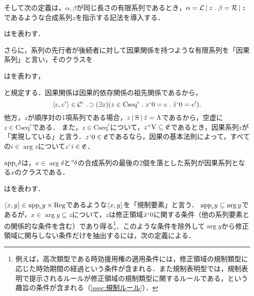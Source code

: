 \noindent そして次の定義は，$\alpha,\beta$が同じ長さの有限系列であるとき，$ \alpha = \mathcal{L}\resl z\con{1}\beta = \mathcal{R}\resl z $であるような合成系列$ z $を指示する記法を導入する．
\begin{df}
\label{df:合成系列}
    \kagi{$
        \alpha*\beta
    $}はを表わす．
\end{df}

\noindent さらに，系列の先行者が後続者に対して因果関係を持つような有限系列を「因果系列」と言い，そのクラスを
\begin{df}
\label{df:因果系列}
はを表わす，
\end{df}
\noindent と規定する．因果関係は因果的依存関係の祖先関係であるから，
\[
    \orp{e,e'}\in\mathcal{C}^\epsilon\case{1}{1}{0}
    (\exists z)(
        z\in \mathrm{Cseq}^\epsilon\con{1}z\fap 0 = e\con{1}\tilde{z}\fap 0 = e'
    ).
\]
他方，$z$が順序対の1項系列である場合，$ z\mathbin{\mid}\mathrm{S}\mathbin{\mid}\breve{z}=\Lambda $であるから，空虚に$ z\in\mathrm{Cseq}^\epsilon $である．
また，$z\in\mathrm{Cseq}^\epsilon$について，$z{\mspace{1mu}{``}\mspace{1mu}}\mathrm{V}\subseteq\mathfrak{E}$であるとき，因果系列$z$が「実現している」と言う．$z{\mspace{1mu}{`}\mspace{1mu}} 0\in\mathfrak{E}$であるなら，因果の基本法則によって，すべての$i\in\arg z$について$z{\mspace{1mu}{`}\mspace{1mu}} i\in\mathfrak{E}$．

$\app{\epsilon}\delta$は，$x\in \arg\delta$と$ {^\triangleleft}\delta $の合成系列の最後の2個を落とした系列が因果系列となる$ x $のクラスである．
\begin{df}
\label{df:適用条件}
\kagi{$
    \app{\epsilon} \delta
$}はを表わす．
\end{df}
\noindent $ \langle x,y \rangle\in\mathrm{app}_{\epsilon} y\times\mathrm{Reg} $であるような$ \langle x,y \rangle $を「規制要素」と言う．
$ \mathrm{app}_{\epsilon} y\subseteq\arg y $であるが，$ x\in\arg y\subseteq z $について，$z$は修正領域$ \tilde{x}{\mspace{1mu}{`}\mspace{1mu}} 0 $に関する条件（他の系列要素との関係的な条件を含む）であり得る\footnote{
    例えば，高次類型である時効援用権の適用条件には，修正領域の規制類型に応じた時効期間の経過という条件が含まれる．また規制表明型では，規制表明で提示されるルールが修正領域の規制類型に関するルールである，という趣旨の条件が含まれる（\ref{ssec:規制ルール}）．
}．このような条件を除外して$ \arg y $から修正領域に関与しない条件だけを抽出するには，次の定義による．

